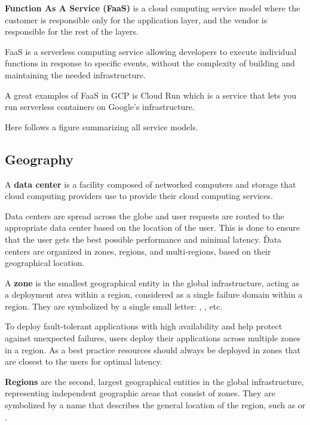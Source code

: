\textbf{Function As A Service (FaaS)} is a cloud computing service model where the customer is responsible only for
the application layer, and the vendor is responsible for the rest of the layers.
\ed

FaaS is a serverless computing service allowing developers to execute individual functions in response to specific
events, without the complexity of building and maintaining the needed infrastructure.

\be
A great examples of FaaS in GCP is Cloud Run which is a service that lets you run serverless containers on Google's
infrastructure.
\ee

Here follows a figure summarizing all service models.


\subsection{Geography}

A \textbf{data center} is a facility composed of networked computers and storage that cloud computing providers use to
provide their cloud computing services.
\ed

Data centers are spread across the globe and user requests are routed to the appropriate data center based on the
location of the user. This is done to ensure that the user gets the best possible performance and minimal latency. \v

Data centers are organized in zones, regions, and multi-regions, based on their geographical location.

\bd[Zone]
A \textbf{zone} is the smallest geographical entity in the global infrastructure, acting as a deployment area within a
region, considered as a single failure domain within a region. They are symbolized by a single small letter: ,
, etc.
\ed

To deploy fault-tolerant applications with high availability and help protect against unexpected failures, users
deploy their applications across multiple zones in a region. As a best practice resources should always be deployed
in zones that are closest to the users for optimal latency.

\bd[Region]
\textbf{Regions} are the second, largest geographical entities in the global infrastructure, representing independent
geographic areas that consist of zones. They are symbolized by a name that describes the general location of the region,
such as  or .
\ed

